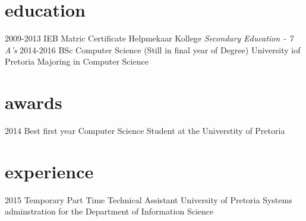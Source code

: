 \documentclass[]{twentysecondcv}
\begin{document}
\section{education}

\begin{twenty}
  \twentyitem
    {2009-2013}
    {IEB Matric Certificate}
    {Helpmekaar Kollege}
    {\emph{Secondary Education - 7 A's}}
  \twentyitem
    {2014-2016}
    {BSc Computer Science (Still in final year of Degree)}
    {University iof Pretoria}
    {Majoring in Computer Science}
\end{twenty}


\section{awards}

\begin{twentyshort}
  \twentyitemshort
    {2014}
    {Best first year Computer Science Student at the Universtity of Pretoria}
\end{twentyshort}


\section{experience}

\begin{twenty}
  \twentyitem
    {2015}
    {Temporary Part Time Technical Assistant}
    {University of Pretoria}
    {Systems adminstration for the Department of Information Science}
\end{twenty}

\end{document}
